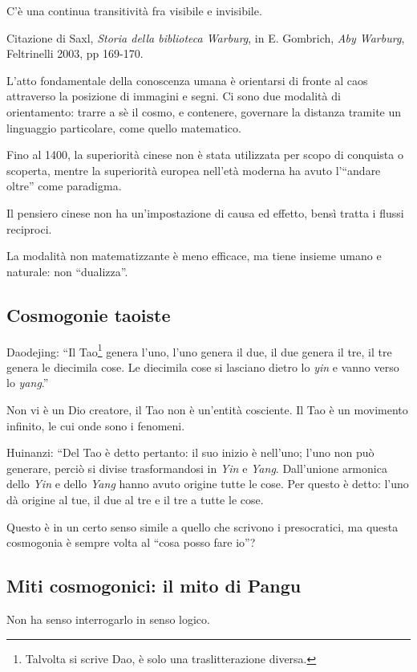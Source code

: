 \documentclass[main.tex]{subfiles}
\begin{document}
C'è una continua transitività fra visibile e invisibile. 

Citazione di Saxl, \emph{Storia della biblioteca Warburg}, in E. Gombrich, \emph{Aby Warburg}, Feltrinelli 2003, pp 169-170.

L'atto fondamentale della conoscenza umana è orientarsi di fronte al caos attraverso la posizione di immagini e segni. 
Ci sono due modalità di orientamento: trarre a sè il cosmo, e contenere, governare la distanza tramite un linguaggio particolare, come quello matematico. 

Fino al 1400, la superiorità cinese non è stata utilizzata per scopo di conquista o scoperta, mentre la superiorità europea nell'età moderna ha avuto l'``andare oltre'' come paradigma. 

Il pensiero cinese non ha un'impostazione di causa ed effetto, bensì tratta i flussi reciproci. 

La modalità non matematizzante è meno efficace, ma tiene insieme umano e naturale: non ``dualizza''. 

\subsection{Cosmogonie taoiste}

Daodejing: ``Il Tao\footnote{Talvolta si scrive Dao, è solo una traslitterazione diversa.} genera l'uno, l'uno genera il due, il due genera il tre, il tre genera le diecimila cose.
Le diecimila cose si lasciano dietro lo \emph{yin} e vanno verso lo \emph{yang}.''

Non vi è un Dio creatore, il Tao non è un'entità cosciente. 
Il Tao è un movimento infinito, le cui onde sono i fenomeni. 

Huinanzi: ``Del Tao è detto pertanto: il suo inizio è nell'uno; l'uno non può generare, perciò si divise trasformandosi in \emph{Yin} e \emph{Yang}. 
Dall'unione armonica dello \emph{Yin} e dello \emph{Yang} hanno avuto origine tutte le cose.
Per questo è detto: l'uno dà origine al tue, il due al tre e il tre a tutte le cose.

Questo è in un certo senso simile a quello che scrivono i presocratici, ma questa cosmogonia è sempre volta al ``cosa posso fare io''?

\subsection{Miti cosmogonici: il mito di Pangu}

Non ha senso interrogarlo in senso logico.
\end{document}
